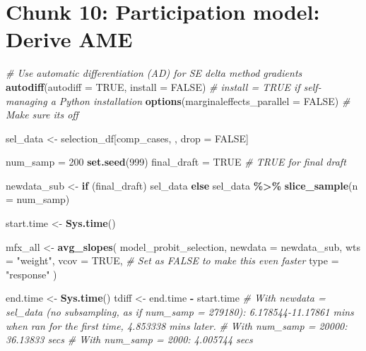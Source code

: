 \documentclass[
]{article}
\newenvironment{Shaded}{\begin{snugshade}}{\end{snugshade}}
\newcommand{\AttributeTok}[1]{\textcolor[rgb]{0.13,0.29,0.53}{#1}}
\newcommand{\CommentTok}[1]{\textcolor[rgb]{0.56,0.35,0.01}{\textit{#1}}}
\newcommand{\ConstantTok}[1]{\textcolor[rgb]{0.56,0.35,0.01}{#1}}
\newcommand{\ControlFlowTok}[1]{\textcolor[rgb]{0.13,0.29,0.53}{\textbf{#1}}}
\newcommand{\DecValTok}[1]{\textcolor[rgb]{0.00,0.00,0.81}{#1}}
\newcommand{\FunctionTok}[1]{\textcolor[rgb]{0.13,0.29,0.53}{\textbf{#1}}}
\newcommand{\NormalTok}[1]{#1}
\newcommand{\OtherTok}[1]{\textcolor[rgb]{0.56,0.35,0.01}{#1}}
\newcommand{\SpecialCharTok}[1]{\textcolor[rgb]{0.81,0.36,0.00}{\textbf{#1}}}
\newcommand{\StringTok}[1]{\textcolor[rgb]{0.31,0.60,0.02}{#1}}
\begin{document}
\section*{Chunk 10: Participation model: Derive AME}\label{chunk-10-participation-model-derive-ame}

\begin{Shaded}
\begin{Highlighting}[]
\CommentTok{\# Use automatic differentiation (AD) for SE delta method gradients}
\FunctionTok{autodiff}\NormalTok{(}\AttributeTok{autodiff =} \ConstantTok{TRUE}\NormalTok{, }\AttributeTok{install =} \ConstantTok{FALSE}\NormalTok{) }\CommentTok{\# install = TRUE if self{-}managing a Python installation}
\FunctionTok{options}\NormalTok{(}\AttributeTok{marginaleffects\_parallel =} \ConstantTok{FALSE}\NormalTok{) }\CommentTok{\# Make sure it\textquotesingle{}s off}

\NormalTok{sel\_data }\OtherTok{\textless{}{-}}\NormalTok{ selection\_df[comp\_cases, , drop }\OtherTok{=} \ConstantTok{FALSE}\NormalTok{]}

\NormalTok{num\_samp }\OtherTok{=} \DecValTok{200}
\FunctionTok{set.seed}\NormalTok{(}\DecValTok{999}\NormalTok{)}
\NormalTok{final\_draft }\OtherTok{=} \ConstantTok{TRUE} \CommentTok{\# TRUE for final draft}

\NormalTok{newdata\_sub }\OtherTok{\textless{}{-}} \ControlFlowTok{if}\NormalTok{ (final\_draft) sel\_data }\ControlFlowTok{else}\NormalTok{ sel\_data }\SpecialCharTok{\%\textgreater{}\%} \FunctionTok{slice\_sample}\NormalTok{(}\AttributeTok{n =}\NormalTok{ num\_samp)}

\NormalTok{start.time }\OtherTok{\textless{}{-}} \FunctionTok{Sys.time}\NormalTok{()}

\NormalTok{mfx\_all }\OtherTok{\textless{}{-}} \FunctionTok{avg\_slopes}\NormalTok{(}
\NormalTok{  model\_probit\_selection,}
  \AttributeTok{newdata =}\NormalTok{ newdata\_sub,}
  \AttributeTok{wts =} \StringTok{"weight"}\NormalTok{,}
  \AttributeTok{vcov =} \ConstantTok{TRUE}\NormalTok{, }\CommentTok{\# Set as FALSE to make this even faster}
  \AttributeTok{type =} \StringTok{"response"}
\NormalTok{)}

\NormalTok{end.time }\OtherTok{\textless{}{-}} \FunctionTok{Sys.time}\NormalTok{()}
\NormalTok{tdiff }\OtherTok{\textless{}{-}}\NormalTok{ end.time }\SpecialCharTok{{-}}\NormalTok{ start.time}
\CommentTok{\# With newdata = sel\_data (no subsampling, as if num\_samp = 279180): 6.178544{-}11.17861 mins when ran for the first time, 4.853338 mins later.}
\CommentTok{\# With num\_samp = 20000: 36.13833 secs}
\CommentTok{\# With num\_samp = 2000: 4.005744 secs}




\end{Highlighting}
\end{Shaded}
\end{document}

